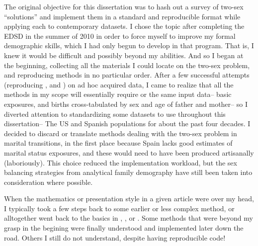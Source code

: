 The original objective for this dissertation was to hash out a survey of two-sex
``solutions'' and implement them in a standard and reproducible format while
applying each to contemporary datasets. I chose the topic after completing the
EDSD in the summer of 2010 in order to force myself to improve my formal
demographic skills, which I had only begun to develop in that program. That
is, I knew it would be difficult and possibly beyond my abilities. And so I
began at the beginning, collecting all the materials I could locate on the 
two-sex problem, and reproducing methods in no particular order. After a few 
successful attempts (reproducing \citet{schoen1981harmonic},
\citet{mc1975models} and \citet{henry1972nuptiality}) on ad hoc acquired data, I
came to realize that all the methods in my scope will essentially require or
the same input data-- basic exposures, and births cross-tabulated by
sex and age of father and mother-- so I diverted attention to standardizing some
datasets to use throughout this dissertation-- The US and Spanish populations
for about the past four decades. I decided to discard or translate methods
dealing with the two-sex problem in marital transitions, in the first place 
because Spain lacks good estimates of marital status exposures, 
and these would need to have been produced artisanally (laboriously). This
choice reduced the implementation workload, but the sex balancing strategies
from analytical family demography have still been taken into consideration where
possible.

When the mathematics or
presentation style in a given article were over my head, I typically took a few
steps back to some earlier or less complex method, or alltogether went back to the basics 
in \citet{sharpe1911problem}, \citet{kuczynski1932fertility}, \citet{coale1972growth} 
or \citet{caswell2001matrix}. Some methods that were beyond my grasp in the 
begining \citep[e.g.][]{mitra1978derivation, gupta1978alternative} were finally
understood and implemented later down the road. Others I still do not 
understand\cite[e.g.][]{choo2006estimating}, despite having
reproducible code!

